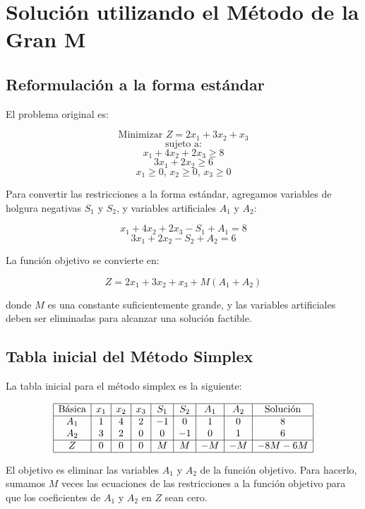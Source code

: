 \documentclass{article}
\begin{document}
\section*{Solución utilizando el Método de la Gran M}

\subsection*{Reformulación a la forma estándar}

El problema original es:

\[
\text{Minimizar } Z = 2x_1 + 3x_2 + x_3
\]
\[
\text{sujeto a:}
\]
\[
x_1 + 4x_2 + 2x_3 \geq 8
\]
\[
3x_1 + 2x_2 \geq 6
\]
\[
x_1 \geq 0, \, x_2 \geq 0, \, x_3 \geq 0
\]

Para convertir las restricciones a la forma estándar, agregamos variables de holgura negativas \(S_1\) y \(S_2\), y variables artificiales \(A_1\) y \(A_2\):

\[
x_1 + 4x_2 + 2x_3 - S_1 + A_1 = 8
\]
\[
3x_1 + 2x_2 - S_2 + A_2 = 6
\]

La función objetivo se convierte en:

\[
Z = 2x_1 + 3x_2 + x_3 + M(A_1 + A_2)
\]

donde \(M\) es una constante suficientemente grande, y las variables artificiales deben ser eliminadas para alcanzar una solución factible.

\subsection*{Tabla inicial del Método Simplex}

La tabla inicial para el método simplex es la siguiente:

\[
\begin{array}{|c|c|c|c|c|c|c|c|c|}
\hline
\text{Básica} & x_1 & x_2 & x_3 & S_1 & S_2 & A_1 & A_2 & \text{Solución} \\
\hline
A_1 & 1 & 4 & 2 & -1 & 0 & 1 & 0 & 8 \\
A_2 & 3 & 2 & 0 & 0 & -1 & 0 & 1 & 6 \\
\hline
Z & 0 & 0 & 0 & M & M & -M & -M & -8M - 6M \\
\hline
\end{array}
\]

El objetivo es eliminar las variables \(A_1\) y \(A_2\) de la función objetivo. Para hacerlo, sumamos \(M\) veces las ecuaciones de las restricciones a la función objetivo para que los coeficientes de \(A_1\) y \(A_2\) en \(Z\) sean cero.
\end{document}
